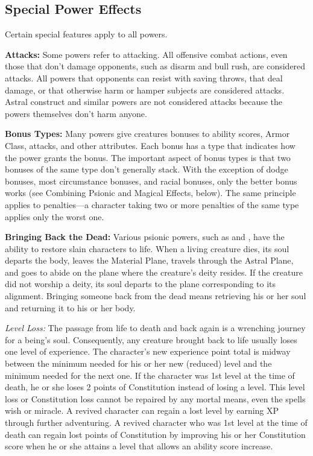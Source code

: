 \subsection{Special Power Effects}
Certain special features apply to all powers.

\textbf{Attacks:} Some powers refer to attacking. All offensive combat actions, even those that don't damage opponents, such as disarm and bull rush, are considered attacks. All powers that opponents can resist with saving throws, that deal damage, or that otherwise harm or hamper subjects are considered attacks. Astral construct and similar powers are not considered attacks because the powers themselves don't harm anyone.

\textbf{Bonus Types:} Many powers give creatures bonuses to ability scores, Armor Class, attacks, and other attributes. Each bonus has a type that indicates how the power grants the bonus. The important aspect of bonus types is that two bonuses of the same type don't generally stack. With the exception of dodge bonuses, most circumstance bonuses, and racial bonuses, only the better bonus works (see Combining Psionic and Magical Effects, below). The same principle applies to penalties---a character taking two or more penalties of the same type applies only the worst one.

\textbf{Bringing Back the Dead:} Various psionic powers, such as  and , have the ability to restore slain characters to life. When a living creature dies, its soul departs the body, leaves the Material Plane, travels through the Astral Plane, and goes to abide on the plane where the creature's deity resides. If the creature did not worship a deity, its soul departs to the plane corresponding to its alignment. Bringing someone back from the dead means retrieving his or her soul and returning it to his or her body.

\textit{Level Loss:} The passage from life to death and back again is a wrenching journey for a being's soul. Consequently, any creature brought back to life usually loses one level of experience. The character's new experience point total is midway between the minimum needed for his or her new (reduced) level and the minimum needed for the next one. If the character was 1st level at the time of death, he or she loses 2 points of Constitution instead of losing a level. This level loss or Constitution loss cannot be repaired by any mortal means, even the spells wish or miracle. A revived character can regain a lost level by earning XP through further adventuring. A revived character who was 1st level at the time of death can regain lost points of Constitution by improving his or her Constitution score when he or she attains a level that allows an ability score increase.

